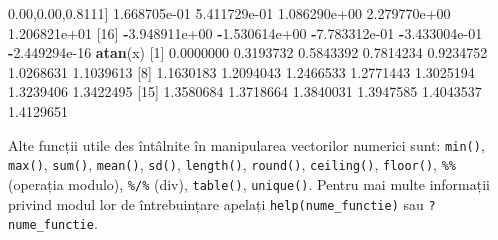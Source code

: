 \documentclass[]{article}
\newenvironment{Shaded}{\begin{snugshade}}{\end{snugshade}}
\newcommand{\KeywordTok}[1]{\textcolor[rgb]{0.13,0.29,0.53}{\textbf{#1}}}
\newcommand{\DecValTok}[1]{\textcolor[rgb]{0.00,0.00,0.81}{#1}}
\newcommand{\FloatTok}[1]{\textcolor[rgb]{0.00,0.00,0.81}{#1}}
\newcommand{\OperatorTok}[1]{\textcolor[rgb]{0.81,0.36,0.00}{\textbf{#1}}}
\newcommand{\NormalTok}[1]{#1}
\begin{document}
\begin{Shaded}
\begin{Highlighting}[]
\NormalTok{[}\DecValTok{11}\NormalTok{]  }\FloatTok{1.668705e-01}  \FloatTok{5.411729e-01}  \FloatTok{1.086290e+00}  \FloatTok{2.279770e+00}  \FloatTok{1.206821e+01}
\NormalTok{[}\DecValTok{16}\NormalTok{] }\OperatorTok{-}\FloatTok{3.948911e+00} \OperatorTok{-}\FloatTok{1.530614e+00} \OperatorTok{-}\FloatTok{7.783312e-01} \OperatorTok{-}\FloatTok{3.433004e-01} \OperatorTok{-}\FloatTok{2.449294e-16}
\KeywordTok{atan}\NormalTok{(x)}
\NormalTok{ [}\DecValTok{1}\NormalTok{] }\FloatTok{0.0000000} \FloatTok{0.3193732} \FloatTok{0.5843392} \FloatTok{0.7814234} \FloatTok{0.9234752} \FloatTok{1.0268631} \FloatTok{1.1039613}
\NormalTok{ [}\DecValTok{8}\NormalTok{] }\FloatTok{1.1630183} \FloatTok{1.2094043} \FloatTok{1.2466533} \FloatTok{1.2771443} \FloatTok{1.3025194} \FloatTok{1.3239406} \FloatTok{1.3422495}
\NormalTok{[}\DecValTok{15}\NormalTok{] }\FloatTok{1.3580684} \FloatTok{1.3718664} \FloatTok{1.3840031} \FloatTok{1.3947585} \FloatTok{1.4043537} \FloatTok{1.4129651}
\end{Highlighting}
\end{Shaded}

Alte funcții utile des întâlnite în manipularea vectorilor numerici
sunt: \texttt{min()}, \texttt{max()}, \texttt{sum()}, \texttt{mean()},
\texttt{sd()}, \texttt{length()}, \texttt{round()}, \texttt{ceiling()},
\texttt{floor()}, \texttt{\%\%} (operația modulo), \texttt{\%/\%} (div),
\texttt{table()}, \texttt{unique()}. Pentru mai multe informații privind
modul lor de întrebuințare apelați \texttt{help(nume\_functie)} sau
\texttt{?nume\_functie}.
\end{document}
